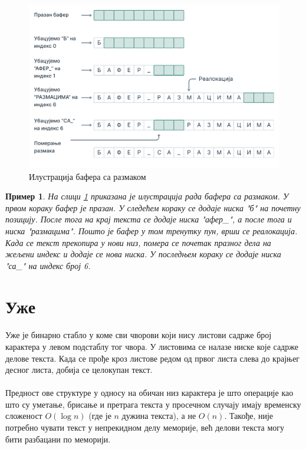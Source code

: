 \documentclass[12pt,oneside]{memoir}
\newtheorem{exmp}{Пример}
\begin{document}
\begin{figure}[!ht]
	\centering
	\includegraphics[width=1.1\textwidth]{images/Bafer_3.png}
	\caption{Илустрација бафера са размаком}
	\label{fig:gap_buffer}
\end{figure}

\begin{exmp}

На слици \ref{fig:gap_buffer} приказана је  илустрација рада бафера са размаком.
У првом кораку бафер је празан. У следећем кораку се додаје ниска \textit{"б"} на почетну позицију. После тога на крај текста се додаје ниска \textit{"афер\_"}, а после тога и ниска
\textit{"размацима"}.  Пошто је бафер у том тренутку пун, врши се реалокација. Када се текст прекопира у нови низ, помера се почетак празног дела на жељени индекс и додаје се
нова ниска. У последњем кораку се додаје ниска \textit{"са\_"} на индекс број 6. 

\end{exmp}


\section{Уже}
\paragraph{}
Уже је бинарно стабло у коме сви чворови који нису листови садрже број карактера у 
левом подстаблу тог чвора. У листовима се налазе ниске које садрже делове текста. 
Када се прође кроз листове редом од првог листа слева до крајњег десног листа, 
добија се целокупан текст.

\paragraph{}
Предност ове структуре у односу на обичан низ карактера је што операције као што су уметање, брисање и претрага текста у просечном случају имају временску сложеност \(O(\log{}n)\) (где је \(n\) дужина текста), а не \(O(n)\). Такође, није потребно чувати
текст у непрекидном делу меморије, већ делови текста могу бити разбацани по меморији.
\end{document}
